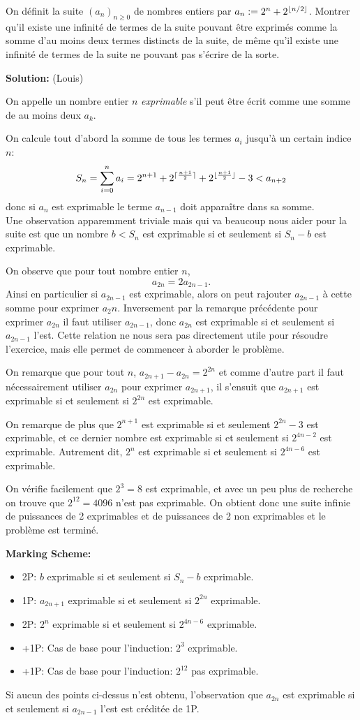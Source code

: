 On définit la suite $(a_n)_{n\geq 0}$ de nombres entiers par $a_n:=2^n+2^{\lfloor n/2\rfloor}$. Montrer qu'il existe une infinité de termes de la suite pouvant être exprimés comme la somme d'au moins deux termes distincts de la suite, de même qu'il existe une infinité de termes de la suite ne pouvant pas s'écrire de la sorte.

\textbf{Solution:} (Louis)

On appelle un nombre entier $n$ \emph{exprimable} s'il peut être écrit comme une somme de au moins deux $a_k$.

On calcule tout d'abord la somme de tous les termes $a_i$ jusqu'à un certain indice $n$:
\[
    S_n = \sum_{i=0}^n{a_i} = 2^{n+1} + 2^{\lceil\frac{n+1}{2}\rceil} + 2^{\lfloor\frac{n+1}{2}\rfloor} -3 < a_{n+2}
\]
donc si $a_n$ est exprimable le terme $a_{n-1}$ doit apparaître dans sa somme.\\
Une observation apparemment triviale mais qui va beaucoup nous aider pour la suite est que un nombre $b < S_n$ est exprimable si et seulement si $S_n - b$ est exprimable.

On observe que pour tout nombre entier $n$,
\[
    a_{2n} = 2 a_{2n-1}.
\]
Ainsi en particulier si $a_{2n-1}$ est exprimable, alors on peut rajouter $a_{2n-1}$ à cette somme pour exprimer $a_2n$. Inversement par la remarque précédente pour exprimer $a_{2n}$ il faut utiliser $a_{2n-1}$, donc $a_{2n}$ est exprimable si et seulement si $a_{2n-1}$ l'est. Cette relation ne nous sera pas directement utile pour résoudre l'exercice, mais elle permet de commencer à aborder le problème.

On remarque que pour tout $n$, $a_{2n+1} - a_{2n} = 2^{2n}$ et comme d'autre part il faut nécessairement utiliser $a_{2n}$ pour exprimer $a_{2n+1}$, il s'ensuit que $a_{2n+1}$ est exprimable si et seulement si $2^{2n}$ est exprimable.

On remarque de plus que $2^{n+1}$ est exprimable si et seulement $2^{2n}-3$ est exprimable, et ce dernier nombre est exprimable si et seulement si $2^{4n-2}$ est exprimable. Autrement dit, $2^n$ est exprimable si et seulement si $2^{4n-6}$ est exprimable.

On vérifie facilement que $2^3 = 8$ est exprimable, et avec un peu plus de recherche on trouve que $2^12 = 4096$ n'est pas exprimable. On obtient donc une suite infinie de puissances de 2 exprimables et de puissances de 2 non exprimables et le problème est terminé.

\textbf{Marking Scheme:}
\begin{itemize}
    \item 2P: $b$ exprimable si et seulement si $S_n - b$ exprimable.
    \item 1P: $a_{2n+1}$ exprimable si et seulement si $2^{2n}$ exprimable.
    \item 2P: $2^n$ exprimable si et seulement si $2^{4n-6}$ exprimable.
    \item +1P: Cas de base pour l'induction: $2^3$ exprimable.
    \item +1P: Cas de base pour l'induction: $2^{12}$ pas exprimable.
\end{itemize}

Si aucun des points ci-dessus n'est obtenu, l'observation que $a_{2n}$ est exprimable si et seulement si $a_{2n-1}$ l'est est créditée de 1P.